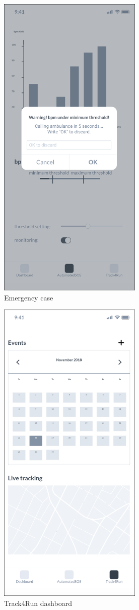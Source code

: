 \documentclass{article}
\begin{document}
	\begin{figure}[!h]
	 	\centering
		\includegraphics[height=15cm,keepaspectratio]{Figures/6Low}
		\caption{Emergency case}
	\end{figure}\newpage	
	
	\begin{figure}[!h]
	 	\centering
		\includegraphics[height=15cm,keepaspectratio]{Figures/7Track4Run}
		\caption{Track4Run dashboard}
	\end{figure}\newpage	
	
\end{document}
